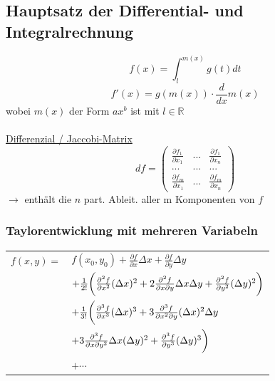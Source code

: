 \subsection{Hauptsatz der Differential- und Integralrechnung}

\begin{equation*}
	f(x)=\int^{m(x)}_lg(t)dt
\end{equation*}
\begin{equation*}
	f'(x)=g(m(x))\cdot\frac{d}{dx}m(x)
\end{equation*}
wobei $m(x)$ der Form $ax^b$ ist mit $l\in \mathbb{R}$\\\\
\underline{Differenzial / Jaccobi-Matrix}
		\begin{equation*}
				df = 
					\begin{pmatrix}
						\frac{\partial f_1}{\partial x_1} & ... & \frac{\partial f_1}{\partial x_n} \\
						... & ... & ... \\
						\frac{\partial f_m}{\partial x_1} & ... & \frac{\partial f_m}{\partial x_n}
					\end{pmatrix}
		\end{equation*}
		$\rightarrow$ enth{\"a}lt die $n$ part. Ableit. aller m Komponenten von $f$\\
\subsubsection*{Taylorentwicklung mit mehreren Variabeln} 
	\begin{tabular}{ll}
		$f(x,y) =  $ & $f(x_0,y_0) + \frac{\partial f}{\partial x} \Delta x + \frac{\partial f}{\partial y} \Delta y$ \\
			& $ + \frac{1}{2!} \bigg{(}
						 \frac{\partial^2 f}{\partial x^2} (\Delta x)^2	
						 + 2\frac{\partial^2 f}{\partial x \partial y} \Delta x \Delta y 
						 + \frac{\partial^2 f}{\partial y^2} (\Delta y)^2	
									\bigg{)} $ \\
			& $ + \frac{1}{3!} \bigg{(}
						 \frac{\partial^3 f}{\partial x^3} (\Delta x)^3
						 + 3\frac{\partial^3 f}{\partial x^2 \partial y} (\Delta x)^2 \Delta y$ \\
			&			\qquad  $+ 3\frac{\partial^3 f}{\partial x \partial y^2} \Delta x (\Delta y)^2 
						 + \frac{\partial^3 f}{\partial y^3} (\Delta y)^3
						\bigg{)} $ \\
			& 			$+ \cdots$			
	
	\end{tabular}

